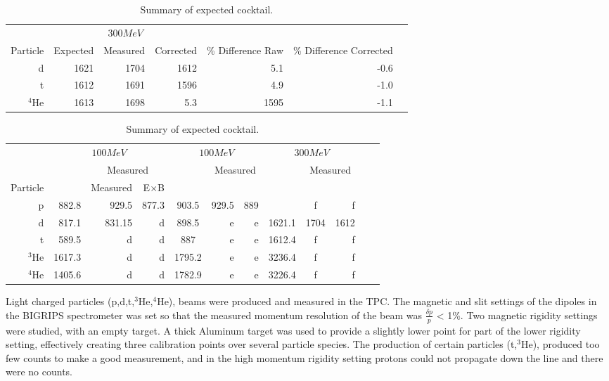 \begin{table*}\centering
{}
\begin{tabular}{@{}rrrrrrr@{}}\toprule
& \multicolumn{3}{c}{$300 MeV$}\\
\cmidrule{2-4}
Particle & Expected & Measured & Corrected & \% Difference Raw & \% Difference Corrected\\
\midrule
d   & 1621 & 1704 & 1612   &  5.1 & -0.6  \\
t   & 1612 & 1691 & 1596   &  4.9  & -1.0\\
${}^{4}$He   & 1613 & 1698 &  5.3 & 1595  & -1.1\\

\bottomrule
\end{tabular}
\caption{Summary of expected cocktail. }
\label{tb:cocktail300}
\end{table*}


\begin{table*}\centering
{}
\begin{tabular}{@{}rrrrcrrrcrrr@{}}\toprule
& \multicolumn{3}{c}{$100 MeV$} & \multicolumn{3}{c}{$100 MeV$} & \multicolumn{3}{c}{$300 MeV$}\\
\cmidrule{2-4} \cmidrule{6-8} \cmidrule{10-12}
& &\multicolumn{2}{c}{Measured} & & \multicolumn{2}{c}{Measured} & & \multicolumn{2}{c}{Measured}\\
\cmidrule{3-4} \cmidrule{7-8} \cmidrule{11-12}
Particle &\phantom{abc} & Measured & E$\times$B\\
\midrule
p   & 882.8 & 929.5 & 877.3 & 903.5 & 929.5 & 889 &\phantom{abcdef} & f & f \\
d   & 817.1 & 831.15 & d & 898.5 & e & e & 1621.1 & 1704 & 1612\\
t   & 589.5 & d & d & 887 & e & e & 1612.4 & f & f  \\
$^{3}$He  & 1617.3  & d & d & 1795.2 & e & e & 3236.4 & f & f\\
$^{4}$He  & 1405.6  & d & d & 1782.9 & e & e & 3226.4 & f & f \\
\bottomrule
\end{tabular}
\caption{Summary of expected cocktail. }
\label{tb:cocktailsummary}
\end{table*}

Light charged particles (p,d,t,${}^{3}$He,${}^{4}$He), beams were produced and measured in the TPC. The magnetic and slit settings of the dipoles in the BIGRIPS spectrometer was set so that the measured momentum resolution of the beam was $\frac{\delta p}{p}$ < 1\%. Two magnetic rigidity settings were studied, with an empty target. A thick Aluminum target was used to provide a slightly lower point for part of the lower rigidity setting, effectively creating three calibration points over several particle species. The production of certain particles (t,${}^{3}$He), produced too few counts to make a good measurement, and in the high momentum rigidity setting protons could not propagate down the line and there were no counts. 

